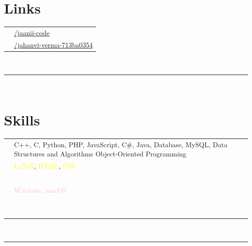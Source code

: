 \documentclass[oneside]{article}
\begin{document}
{\begin{minipage}[t][\textheight-2\fboxsep-2\fboxrule][t]{\dimexpr0.40\textwidth-2\fboxrule-2\fboxsep\relax}
        \section*{\large Links}
        \begin{tabular}{cl}
            \faGithub{}   & \href{https://github.com/jaanii-code}{/jaanii-code} \\
            \faLinkedin{} & \href{https://www.linkedin.com/in/jahanvi-verma-713ba0354/}{/jahanvi-verma-713ba0354} \\
        \end{tabular}
        \vspace{0.2cm} \\
        \rule{\linewidth}{0.4pt} \\

        \section*{\large Skills}
        \vspace*{-0.2cm}
        \begin{tabularx}{\textwidth}{cY}
       
    \faCode{} &
   {C++},
    {C},
    {Python},
    {PHP},
    {JavaScript},
    {C\#},
    {Java},
    {Database},
    {MySQL},
    {Data Structures and Algorithms}
    {Object-Oriented Programming}
    \\

    \faPen*{} &
    \textcolor{yellow}{\LaTeX},
    \textcolor{yellow}{HTML},
    \textcolor{yellow}{CSS} \\

    \faFont{} &
    \textcolor{white}{{MS Office, GSuite, Adobe Acrobat}} \\

    \faCogs{} &
    \textcolor{pink}{Windows, macOS} \\
    \faUsers{} &
     \textcolor{white}{{TeamWork, Time-Management, Critical Thinking,  Problem Solving,  Logical Thinking, Communication skils, Adapatability, creativity}} \\

\end{tabularx}
 \vspace{0pt} \\
        \rule{\linewidth}{0.4pt} %
        \vspace*{-0.3cm}

\end{minipage}}
\end{document}
